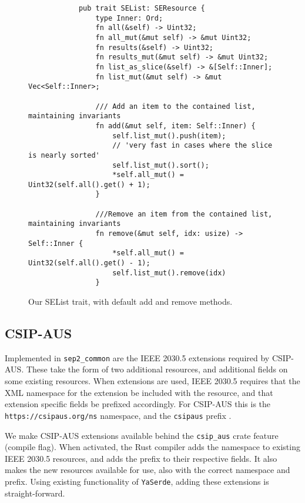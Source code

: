 \begin{figure}[H]
    \begin{center}
        \begin{lstlisting}
            pub trait SEList: SEResource {
                type Inner: Ord;
                fn all(&self) -> Uint32;
                fn all_mut(&mut self) -> &mut Uint32;
                fn results(&self) -> Uint32;
                fn results_mut(&mut self) -> &mut Uint32;
                fn list_as_slice(&self) -> &[Self::Inner];
                fn list_mut(&mut self) -> &mut Vec<Self::Inner>;
            
                /// Add an item to the contained list, maintaining invariants
                fn add(&mut self, item: Self::Inner) {
                    self.list_mut().push(item);
                    // 'very fast in cases where the slice is nearly sorted'
                    self.list_mut().sort();
                    *self.all_mut() = Uint32(self.all().get() + 1);
                }
                
                ///Remove an item from the contained list, maintaining invariants
                fn remove(&mut self, idx: usize) -> Self::Inner {
                    *self.all_mut() = Uint32(self.all().get() - 1);
                    self.list_mut().remove(idx)
                }
        \end{lstlisting}
        \label{fig:listtraitimpl}
        \caption{Our SEList trait, with default add and remove methods.}
    \end{center}
\end{figure}

\subsection{CSIP-AUS}
Implemented in \texttt{sep2\_common} are the IEEE 2030.5 extensions required by CSIP-AUS. These take the form of two additional resources, and additional fields on some existing resources. When extensions are used, IEEE 2030.5 requires that the XML namespace for the extension be included with the resource, and that extension specific fields be prefixed accordingly. For CSIP-AUS this is the \texttt{https://csipaus.org/ns} namespace, and the \texttt{csipaus} prefix  \cite{CSIPAus}.

We make CSIP-AUS extensions available behind the \texttt{csip\_aus} crate feature (compile flag). When activated, the Rust compiler adds the namespace to existing IEEE 2030.5 resources, and adds the prefix to their respective fields. It also makes the new resources available for use, also with the correct namespace and prefix. Using existing functionality of \texttt{YaSerde}, adding these extensions is straight-forward.

